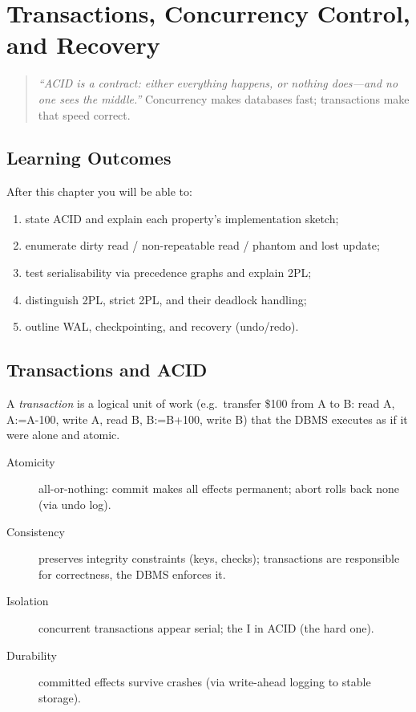 \chapter{Transactions, Concurrency Control, and Recovery}
\label{ch:transactions}

\begin{quote}
\emph{``ACID is a contract: either everything happens, or nothing does---and no one sees the middle.''} Concurrency makes databases fast; transactions make that speed correct.
\end{quote}

\noindent{}
\vspace{0.4em}

\section*{Learning Outcomes}
After this chapter you will be able to:
\begin{enumerate}[label=(L\arabic*)]
    \item state ACID and explain each property's implementation sketch;
    \item enumerate dirty read / non-repeatable read / phantom and lost update;
    \item test serialisability via precedence graphs and explain 2PL;
    \item distinguish 2PL, strict 2PL, and their deadlock handling;
    \item outline WAL, checkpointing, and recovery (undo/redo).
\end{enumerate}

\section{Transactions and ACID}
\label{sec:acid}

A \emph{transaction} is a logical unit of work (e.g.\ transfer \$100 from A to B: read A, A:=A-100, write A, read B, B:=B+100, write B) that the DBMS executes as if it were alone and atomic.

\begin{description}
    \item[Atomicity] all-or-nothing: commit makes all effects permanent; abort rolls back none (via undo log).
    \item[Consistency] preserves integrity constraints (keys, checks); transactions are responsible for correctness, the DBMS enforces it.
    \item[Isolation] concurrent transactions appear serial; the I in ACID (the hard one).
    \item[Durability] committed effects survive crashes (via write-ahead logging to stable storage).
\end{description}

